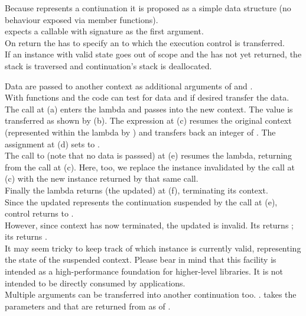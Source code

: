 
Because \cont represents a contiunation it is proposed as a simple data
structure (no behaviour exposed via member functions).\\
\call expects a callable with signature
 as the first argument.\\
On return the \entryfn has to specify an \cont to which the execution control is
transferred.\\
If an instance with valid state goes out of scope and the \entryfn has not yet
returned, the stack is traversed  and continuation's stack is deallocated.


\label{subsec:data}

Data are passed to another context as additional arguments of \call and
\resume.\\
With functions \davail and \dtransfer the code can test for data and if desired
transfer the data.
The  call at (a) enters the lambda and passes  into the
new context. The value is transferred as shown by (b). The expression
 at (c) resumes the original context (represented
within the lambda by ) and transfers back an integer of .
The assignment at (d) sets  to .\\
The call to  (note that no data is passsed) at (e) resumes the
 lambda, returning from the  call at (c). Here, too,
we replace the \cont instance  invalidated by the \resume call at (c)
with the new instance returned by that same \resume call.\\
Finally the lambda returns (the updated)  at (f), terminating its
context.\\
Since the updated  represents the continuation suspended by the call at
(e), control returns to \main.\\
However, since context  has now terminated, the updated  is
invalid. Its \opbool returns ; its  returns
.\\
It may seem tricky to keep track of which \cont instance is currently valid,
representing the state of the suspended context. Please bear in mind that this
facility is intended as a high-performance foundation for higher-level
libraries. It is not intended to be directly consumed by applications.\\
Multiple arguments can be transferred into another continuation too.
.
\call takes the parameters  and  that are returned from \dtransfer
as  of .


